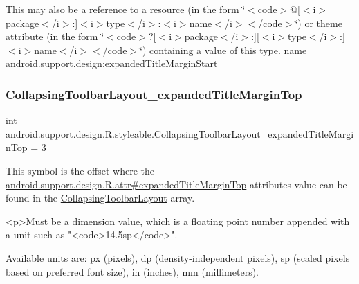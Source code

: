 This may also be a reference to a resource (in the form \char`\"{}$<$code$>$@\mbox{[}$<$i$>$package$<$/i$>$\+:\mbox{]}$<$i$>$type$<$/i$>$\+:$<$i$>$name$<$/i$>$$<$/code$>$\char`\"{}) or theme attribute (in the form \char`\"{}$<$code$>$?\mbox{[}$<$i$>$package$<$/i$>$\+:\mbox{]}\mbox{[}$<$i$>$type$<$/i$>$\+:\mbox{]}$<$i$>$name$<$/i$>$$<$/code$>$\char`\"{}) containing a value of this type.  name android.\+support.\+design\+:expanded\+Title\+Margin\+Start \mbox{\label{classandroid_1_1support_1_1design_1_1R_1_1styleable_aa857ae82aafd5733306283d8cebed1b9}} 
\subsubsection{\texorpdfstring{Collapsing\+Toolbar\+Layout\+\_\+expanded\+Title\+Margin\+Top}{CollapsingToolbarLayout\_expandedTitleMarginTop}}
{\footnotesize\ttfamily int android.\+support.\+design.\+R.\+styleable.\+Collapsing\+Toolbar\+Layout\+\_\+expanded\+Title\+Margin\+Top = 3\hspace{0.3cm}{\ttfamily [static]}}

This symbol is the offset where the \hyperlink{classandroid_1_1support_1_1design_1_1R_1_1attr_a2a060c1031bda301907e94df7c9ac9a9}{android.\+support.\+design.\+R.\+attr\#expanded\+Title\+Margin\+Top} attribute\textquotesingle{}s value can be found in the \hyperlink{classandroid_1_1support_1_1design_1_1R_1_1styleable_a4a019838b1c3daad84b4ffff397db335}{Collapsing\+Toolbar\+Layout} array.

\begin{DoxyVerb}      <p>Must be a dimension value, which is a floating point number appended with a unit such as "<code>14.5sp</code>".
\end{DoxyVerb}
 Available units are\+: px (pixels), dp (density-\/independent pixels), sp (scaled pixels based on preferred font size), in (inches), mm (millimeters). 

